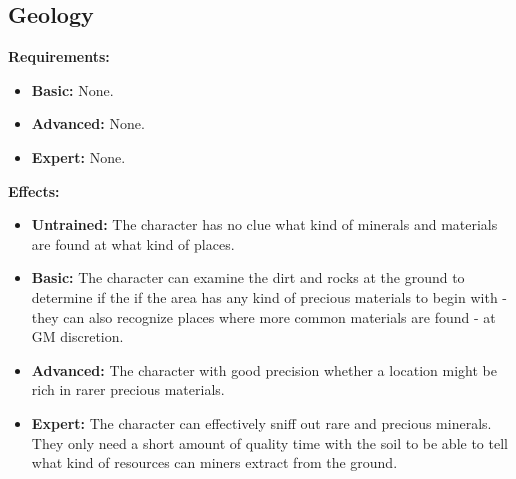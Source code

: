 \subsection{Geology}
\textbf{Requirements:}
\begin{itemize}
	\item \textbf{Basic:} None.
	\item \textbf{Advanced:} None.
	\item \textbf{Expert:} None.
\end{itemize}
\textbf{Effects:}
\begin{itemize}
	\item \textbf{Untrained:} The character has no clue what kind of minerals and materials are found at what kind of places.
	\item \textbf{Basic:} The character can examine the dirt and rocks at the ground to determine if the if the area has any kind of precious materials to begin with - they can also recognize places where more common materials  are found - at GM discretion.
	\item \textbf{Advanced:} The character with good precision whether a location might be rich in rarer precious materials.
	\item \textbf{Expert:} The character can effectively sniff out rare and precious minerals. They only need a short amount of quality time with the soil to be able to tell what kind of resources can miners extract from the ground.
\end{itemize}\newpage
